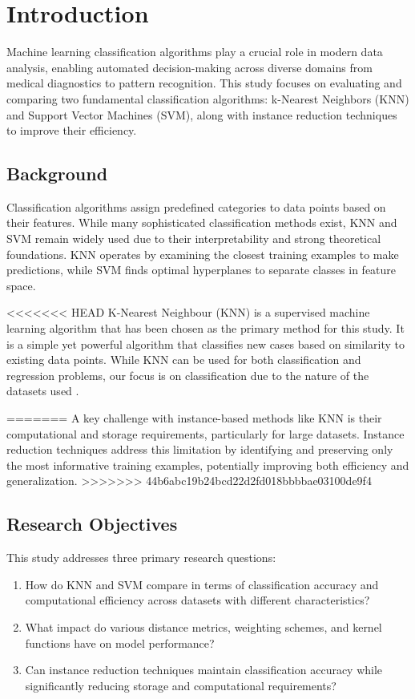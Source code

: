 \section{Introduction}
\label{sec:introduction}

Machine learning classification algorithms play a crucial role in modern data analysis, enabling automated decision-making across diverse domains from medical diagnostics to pattern recognition. This study focuses on evaluating and comparing two fundamental classification algorithms: k-Nearest Neighbors (KNN) and Support Vector Machines (SVM), along with instance reduction techniques to improve their efficiency.

\subsection{Background}

Classification algorithms assign predefined categories to data points based on their features. While many sophisticated classification methods exist, KNN and SVM remain widely used due to their interpretability and strong theoretical foundations. KNN operates by examining the closest training examples to make predictions, while SVM finds optimal hyperplanes to separate classes in feature space.

<<<<<<< HEAD
K-Nearest Neighbour (KNN) is a supervised machine learning algorithm that has been chosen as the primary method for this study.
It is a simple yet powerful algorithm that classifies new cases based on similarity to existing data points.
While KNN can be used for both classification and regression problems, our focus is on classification due to 
the nature of the datasets used \cite{knn}.\par
=======
A key challenge with instance-based methods like KNN is their computational and storage requirements, particularly for large datasets. Instance reduction techniques address this limitation by identifying and preserving only the most informative training examples, potentially improving both efficiency and generalization.
>>>>>>> 44b6abc19b24bcd22d2fd018bbbbae03100de9f4

\subsection{Research Objectives}

This study addresses three primary research questions:

\begin{enumerate}
    \item How do KNN and SVM compare in terms of classification accuracy and computational efficiency across datasets with different characteristics?
    \item What impact do various distance metrics, weighting schemes, and kernel functions have on model performance?
    \item Can instance reduction techniques maintain classification accuracy while significantly reducing storage and computational requirements?
\end{enumerate}

